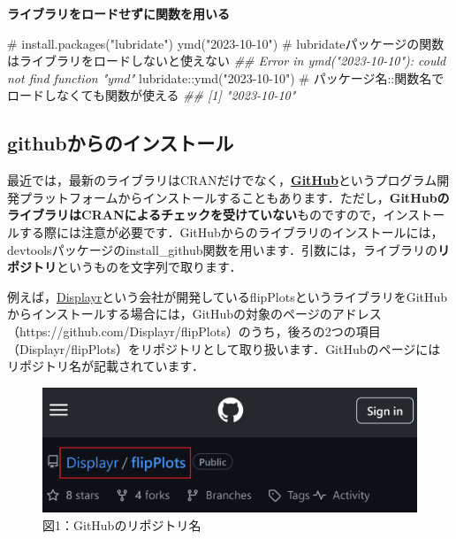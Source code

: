 \documentclass[
  letterpaper,
  DIV=11,
  numbers=noendperiod]{scrreprt}
\newenvironment{Shaded}{\begin{snugshade}}{\end{snugshade}}
\newcommand{\CommentTok}[1]{\textcolor[rgb]{0.37,0.37,0.37}{#1}}
\newcommand{\DocumentationTok}[1]{\textcolor[rgb]{0.37,0.37,0.37}{\textit{#1}}}
\newcommand{\FunctionTok}[1]{\textcolor[rgb]{0.28,0.35,0.67}{#1}}
\newcommand{\NormalTok}[1]{\textcolor[rgb]{0.00,0.23,0.31}{#1}}
\newcommand{\SpecialCharTok}[1]{\textcolor[rgb]{0.37,0.37,0.37}{#1}}
\newcommand{\StringTok}[1]{\textcolor[rgb]{0.13,0.47,0.30}{#1}}
\begin{document}
\textbf{ライブラリをロードせずに関数を用いる}

\begin{Shaded}
\begin{Highlighting}[]
\CommentTok{\# install.packages("lubridate")}
\FunctionTok{ymd}\NormalTok{(}\StringTok{"2023{-}10{-}10"}\NormalTok{) }\CommentTok{\# lubridateパッケージの関数はライブラリをロードしないと使えない}
\DocumentationTok{\#\# Error in ymd("2023{-}10{-}10"): could not find function "ymd"}
\NormalTok{lubridate}\SpecialCharTok{::}\FunctionTok{ymd}\NormalTok{(}\StringTok{"2023{-}10{-}10"}\NormalTok{) }\CommentTok{\# パッケージ名::関数名でロードしなくても関数が使える}
\DocumentationTok{\#\# [1] "2023{-}10{-}10"}
\end{Highlighting}
\end{Shaded}

\hypertarget{githubux304bux3089ux306eux30a4ux30f3ux30b9ux30c8ux30fcux30eb}{%
\subsection{githubからのインストール}\label{githubux304bux3089ux306eux30a4ux30f3ux30b9ux30c8ux30fcux30eb}}

最近では，最新のライブラリはCRANだけでなく，\href{https://github.co.jp/}{\textbf{GitHub}}というプログラム開発プラットフォームからインストールすることもあります．ただし，\textbf{GitHubのライブラリはCRANによるチェックを受けていない}ものですので，インストールする際には注意が必要です．GitHubからのライブラリのインストールには，devtoolsパッケージのinstall\_github関数を用います．引数には，ライブラリの\textbf{リポジトリ}というものを文字列で取ります．

例えば，\href{https://www.displayr.com/}{Displayr}という会社が開発しているflipPlotsというライブラリをGitHubからインストールする場合には，GitHubの対象のページのアドレス（https://github.com/Displayr/flipPlots）のうち，後ろの2つの項目（Displayr/flipPlots）をリポジトリとして取り扱います．GitHubのページにはリポジトリ名が記載されています．

\begin{figure}

{\centering \includegraphics{././image/github_reponame.png}

}

\caption{図1：GitHubのリポジトリ名}

\end{figure}
\end{document}
